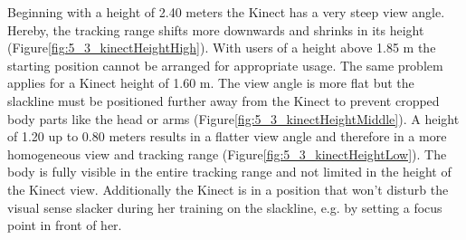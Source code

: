 Beginning with a height of 2.40 meters the Kinect has a very steep view angle.
Hereby, the tracking range shifts more downwards and shrinks in its height (Figure\ref{fig:5_3_kinectHeightHigh}).
With users of a height above 1.85 m the starting position cannot be arranged for appropriate usage.
The same problem applies for a Kinect height of 1.60 m. The view angle is more flat but the slackline must be positioned further away from the Kinect to prevent cropped body parts like the head or arms (Figure\ref{fig:5_3_kinectHeightMiddle}).
A height of 1.20 up to 0.80 meters results in a flatter view angle and therefore in a more homogeneous view and tracking range (Figure\ref{fig:5_3_kinectHeightLow}).
The body is fully visible in the entire tracking range and not limited in the height of the Kinect view.
Additionally the Kinect is in a position that won't disturb the visual sense slacker during her training on the slackline, e.g. by setting a focus point in front of her.

